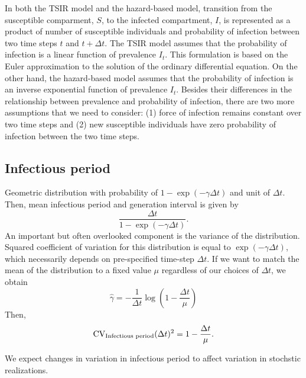 \documentclass{article}
\begin{document}
In both the TSIR model and the hazard-based model, transition from the susceptible comparment, $S$, to the infected compartment, $I$, is represented as a product of number of susceptible individuals and probability of infection between two time steps $t$ and $t + \Delta t$.
The TSIR model assumes that the probability of infection is a linear function of prevalence $I_t$.
This formulation is based on the Euler approximation to the solution of the ordinary differential equation.
On the other hand, the hazard-based model assumes that the probability of infection is an inverse exponential function of prevalence $I_t$.
Besides their differences in the relationship between prevalence and probability of infection, there are two more assumptions that we need to consider: (1) force of infection remains constant over two time steps and (2) new susceptible individuals have zero probability of infection between the two time steps.



\subsection{Infectious period}

Geometric distribution with probability of $1-\exp(-\gamma \Delta t)$ and unit of $\Delta t$.
Then, mean infectious period and generation interval is given by 
\begin{equation}
\frac{\Delta t}{1-\exp(-\gamma \Delta t)}.
\end{equation}
An important but often overlooked component is the variance of the distribution.
Squared coefficient of variation for this distribution is equal to $\exp(-\gamma \Delta t)$, which necessarily depends on pre-specified time-step $\Delta t$.
If we want to match the mean of the distribution to a fixed value $\mu$ regardless of our choices of $\Delta t$, we obtain 
\begin{equation}
\hat \gamma = - \frac{1}{\Delta t} \log\left(1 - \frac{\Delta t}{\mu}\right)
\end{equation}
Then,
\begin{equation}
\mathrm{CV}_{\tiny\textrm{Infectious period}}(\Delta t)^2 = 1 - \frac{\Delta t}{\mu}.
\end{equation}

We expect changes in variation in infectious period to affect variation in stochstic realizations.
\end{document}
